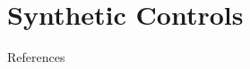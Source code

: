 \documentclass[aspectratio=169]{beamer}
\begin{document}
\section{Synthetic Controls}


	\begin{frame}[t,allowframebreaks]{References}
	  \printbibliography
	\end{frame}
\end{document}
